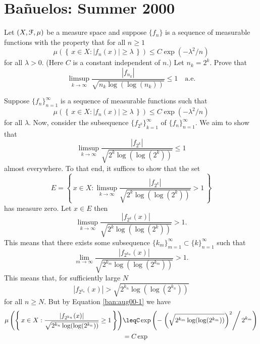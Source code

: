 \section{Bañuelos: Summer 2000}
\setcounter{exercise}{0}
\setcounter{equation}{0}
\begin{problem}
  Let $(X,\mathcal{F},\mu)$ be a measure space and suppose $\{f_n\}$ is a
  sequence of measurable functions with the property that for all
  $n\geq 1$
  \[
    \mu\left(\left\{\,x\in X:|f_n(x)|\geq\lambda\,\right\}\right)\leq C
    \exp(-\lambda^2/n)
  \]
  for all $\lambda>0$. (Here $C$ is a constant independent of $n$.) Let
  $n_k=2^k$. Prove that
  \[
    \limsup_{k\to\infty}\frac{|f_{n_k}|}{\sqrt{n_k\log(\log(n_k))}}\leq
    1\quad\text{a.e.}
  \]
\end{problem}
\begin{solution}
  Suppose ${\{f_n\}}_{n=1}^\infty$ is a sequence of measurable functions
  such that
  \begin{equation}
    \label{ban:aug00-1}%
    \mu\left(\left\{\,x\in X:|f_n(x)|\geq\lambda\,\right\}\right)\leq C
    \exp(-\lambda^2/n)
  \end{equation}
    for all $\lambda$. Now, consider the subsequence
  ${\{f_{2^k}\}}_{k=1}^\infty$ of ${\{f_n\}}_{n=1}^\infty$. We aim to show
  that
  \[
    \limsup_{k\to\infty}\frac{|f_{2^k}|}{\sqrt{2^k\log(\log(2^k))}}\leq 1
  \]
  almost everywhere. To that end, it suffices to show that the set
  \[
    E=%
    \left\{\,%
      x\in
      X:\limsup_{k\to\infty}\frac{|f_{2^k}|}{\sqrt{2^k\log(\log(2^k))}}>1%
      \,%
    \right\}
  \]
  has measure zero. Let $x\in E$ then
  \[
    \limsup_{k\to\infty} \frac{|f_{2^k}(x)|}{\sqrt{2^k\log(\log(2^k))}}>1.
  \]
  This means that there exists some subsequence
  $\{k_m\}_{m=1}^\infty\subset\{k\}_{n=1}^\infty$ such that
  \[
    \lim_{m\to\infty}\frac{|f_{2^{k_m}}(x)|}{\sqrt{2^{k_m}\log(\log(2^{k_m}))}}>1.
  \]
  This means that, for sufficiently large $N$
  \[
    |f_{2^{k_n}}(x)|>\sqrt{2^{k_n}\log(\log(2^{k_n}))}
  \]
  for all $n\geq N$. But by Equation \eqref{ban:aug00-1} we have
  \begin{align*}
    \mu\left(\left\{\,%
    x\in X:\frac{|f_{2^{k_n}}(x)|}{\sqrt{2^{k_n}\log(\log(2^{k_n}))}}\geq 1
    \,\right\}\right)
    &\leq%
      C\exp\left(-\left.
      \left(\sqrt{2^{k_m}\log(\log(2^{k_m}))}\right)^2\right/2^{k_m}%
      \right)\\
    &=C\exp
  \end{align*}
\end{solution}

